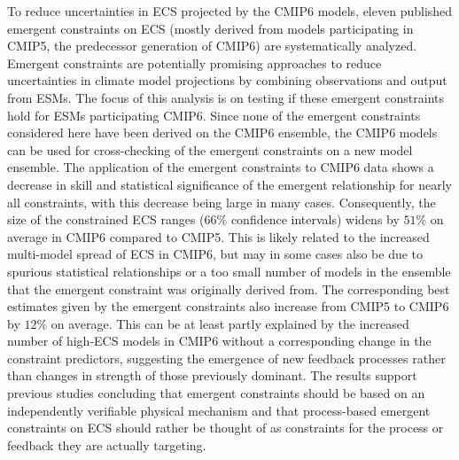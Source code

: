 To reduce uncertainties in \acs{ECS} projected by the \acs{CMIP}6 models,
eleven published emergent constraints on \acs{ECS} (mostly derived from models
participating in \acs{CMIP}5, the predecessor generation of \acs{CMIP}6) are
systematically analyzed. Emergent constraints are potentially promising
approaches to reduce uncertainties in climate model projections by combining
observations and output from \acsp{ESM}. The focus of this analysis is on
testing if these emergent constraints hold for \acsp{ESM} participating
\acs{CMIP}6. Since none of the emergent constraints considered here have been
derived on the \acs{CMIP}6 ensemble, the \acs{CMIP}6 models can be used for
cross-checking of the emergent constraints on a new model ensemble. The
application of the emergent constraints to \acs{CMIP}6 data shows a decrease in
skill and statistical significance of the emergent relationship for nearly all
constraints, with this decrease being large in many cases. Consequently, the
size of the constrained \acs{ECS} ranges ($66 \unit{\%}$ confidence intervals)
widens by $51 \unit{\%}$ on average in \acs{CMIP}6 compared to \acs{CMIP}5.
This is likely related to the increased multi-model spread of \acs{ECS} in
\acs{CMIP}6, but may in some cases also be due to spurious statistical
relationships or a too small number of models in the ensemble that the emergent
constraint was originally derived from. The corresponding best estimates given
by the emergent constraints also increase from \acs{CMIP}5 to \acs{CMIP}6 by
$12 \unit{\%}$ on average. This can be at least partly explained by the
increased number of high-\acs{ECS} models in \acs{CMIP}6 without a
corresponding change in the constraint predictors, suggesting the emergence of
new feedback processes rather than changes in strength of those previously
dominant. The results support previous studies concluding that emergent
constraints should be based on an independently verifiable physical mechanism
and that process-based emergent constraints on \acs{ECS} should rather be
thought of as constraints for the process or feedback they are actually
targeting.

